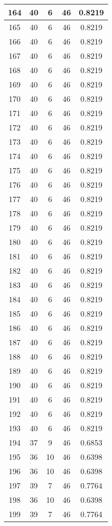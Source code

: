 \documentclass[letterpaper, 12pt]{article}
\begin{document}
\begin{longtable}{|c|c|c|c|c|}
\hline
164 & 40 & 6 & 46 & 0.8219 \\
\hline
165 & 40 & 6 & 46 & 0.8219 \\
\hline
166 & 40 & 6 & 46 & 0.8219 \\
\hline
167 & 40 & 6 & 46 & 0.8219 \\
\hline
168 & 40 & 6 & 46 & 0.8219 \\
\hline
169 & 40 & 6 & 46 & 0.8219 \\
\hline
170 & 40 & 6 & 46 & 0.8219 \\
\hline
171 & 40 & 6 & 46 & 0.8219 \\
\hline
172 & 40 & 6 & 46 & 0.8219 \\
\hline
173 & 40 & 6 & 46 & 0.8219 \\
\hline
174 & 40 & 6 & 46 & 0.8219 \\
\hline
175 & 40 & 6 & 46 & 0.8219 \\
\hline
176 & 40 & 6 & 46 & 0.8219 \\
\hline
177 & 40 & 6 & 46 & 0.8219 \\
\hline
178 & 40 & 6 & 46 & 0.8219 \\
\hline
179 & 40 & 6 & 46 & 0.8219 \\
\hline
180 & 40 & 6 & 46 & 0.8219 \\
\hline
181 & 40 & 6 & 46 & 0.8219 \\
\hline
182 & 40 & 6 & 46 & 0.8219 \\
\hline
183 & 40 & 6 & 46 & 0.8219 \\
\hline
184 & 40 & 6 & 46 & 0.8219 \\
\hline
185 & 40 & 6 & 46 & 0.8219 \\
\hline
186 & 40 & 6 & 46 & 0.8219 \\
\hline
187 & 40 & 6 & 46 & 0.8219 \\
\hline
188 & 40 & 6 & 46 & 0.8219 \\
\hline
189 & 40 & 6 & 46 & 0.8219 \\
\hline
190 & 40 & 6 & 46 & 0.8219 \\
\hline
191 & 40 & 6 & 46 & 0.8219 \\
\hline
192 & 40 & 6 & 46 & 0.8219 \\
\hline
193 & 40 & 6 & 46 & 0.8219 \\
\hline
194 & 37 & 9 & 46 & 0.6853 \\
\hline
195 & 36 & 10 & 46 & 0.6398 \\
\hline
196 & 36 & 10 & 46 & 0.6398 \\
\hline
197 & 39 & 7 & 46 & 0.7764 \\
\hline
198 & 36 & 10 & 46 & 0.6398 \\
\hline
199 & 39 & 7 & 46 & 0.7764 \\
\hline
\end{longtable}
\end{document}
